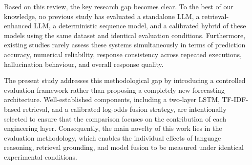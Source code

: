 Based on this review, the key research gap becomes clear. To the best of
our knowledge, no previous study has evaluated a standalone LLM, a
retrieval-enhanced LLM, a deterministic sequence model, and a calibrated
hybrid of these models using the same dataset and identical evaluation
conditions. Furthermore, existing studies rarely assess these systems
simultaneously in terms of prediction accuracy, numerical reliability,
response consistency across repeated executions, hallucination
behaviour, and overall response quality.

The present study addresses this methodological gap by introducing a
controlled evaluation framework rather than proposing a completely new
forecasting architecture. Well-established components, including a
two-layer LSTM, TF-IDF-based retrieval, and a calibrated log-odds fusion
strategy, are intentionally selected to ensure that the comparison
focuses on the contribution of each engineering layer. Consequently, the
main novelty of this work lies in the evaluation methodology, which
enables the individual effects of language reasoning, retrieval
grounding, and model fusion to be measured under identical experimental
conditions.
